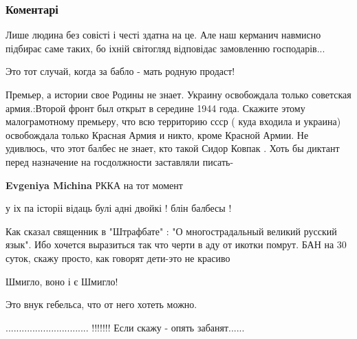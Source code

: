  
 
 
 
 
\subsubsection{Коментарі}

\begin{itemize} %

Лише людина без совісті і честі здатна на це. Але наш керманич навмисно
підбирає саме таких, бо іхній світогляд відповідає замовленню господарів...

Это тот случай, когда за бабло - мать родную продаст!


Премьер, а истории свое Родины не знает. Украину освобождала только советская
армия.:Второй фронт был открыт в середине 1944 года. Скажите этому
малограмотному премьеру, что всю территорию ссср ( куда входила и украина)
освобождала только Красная Армия и никто, кроме Красной Армии. Не удивлюсь, что
этот балбес не знает, кто такой Сидор Ковпак . Хоть бы диктант перед назначение
на госдолжности заставляли писать-

\begin{itemize} %
\textbf{Evgeniya Michina} РККА на тот момент
\end{itemize} %

у іх па історіі відаць булі адні двойкі ! блін балбесы !


Как сказал священник в "Штрафбате" : "О многострадальный великий русский язык".
Ибо хочется выразиться так что черти в аду от икотки помрут. БАН на 30 суток,
скажу просто, как говорят дети-это не красиво


Шмигло, воно і є Шмигло!

Это внук гебельса, что от него хотеть можно.

............................... !!!!!!! Если скажу - опять забанят......

\end{itemize} %
